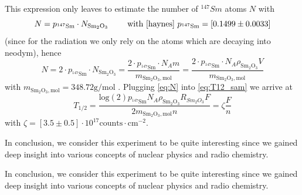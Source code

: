 This expression only leaves to estimate the number of $^{147}Sm$ atoms $N$ with
\begin{equation}
    N = p_{\mathrm{^{147}Sm}} \cdot N_{\mathrm{Sm_2O_3}} 
    \qquad \text{ with \cite{haynes} } p_{\mathrm{^{147}Sm}}= [0.1499\pm0.0033]
\end{equation}
(since for the radiation we only
rely on the atoms which are decaying into neodym), hence
\begin{equation}
    N = 2 \cdot p_{\mathrm{^{147}Sm}} \cdot N_{\mathrm{Sm_2O_3}} 
    = \frac{2 \cdot p_{\mathrm{^{147}Sm}} \cdot N_A m}{m_{\mathrm{Sm_2O_3, mol}}}
    = \frac{2 \cdot p_{\mathrm{^{147}Sm}} \cdot N_A \rho_{\mathrm{Sm_2O_3}} V}{m_{\mathrm{Sm_2O_3, mol}}}
    \label{eq:N}
\end{equation}
with $m_{\mathrm{Sm_2O_3, mol}} = 348.72 \mathrm{g/mol} $ \cite{haynes}. 
Plugging \eqref{eq:N} into \eqref{eq:T12_sam} we arrive at
\begin{equation}
T_{1/2} = \frac{\mathrm{log}(2)p_{\mathrm{^{147}Sm}} 
 N_A \rho_{\mathrm{Sm_2O_3}}R_{Sm_2O_3}F}{2m_{\mathrm{Sm_2O_3, mol}}n } = \zeta \frac{F}{n} 
\label{eq:T12_sam}
\end{equation}
with $\zeta=[3.5\pm0.5]\cdot10^{17} \mathrm{counts \cdot cm^{-2}}$.

In conclusion, we consider this experiment to be quite interesting since we gained deep 
insight into various concepts of nuclear physics and radio chemistry.

In conclusion, we consider this experiment to be quite interesting since we gained deep 
insight into various concepts of nuclear physics and radio chemistry.
